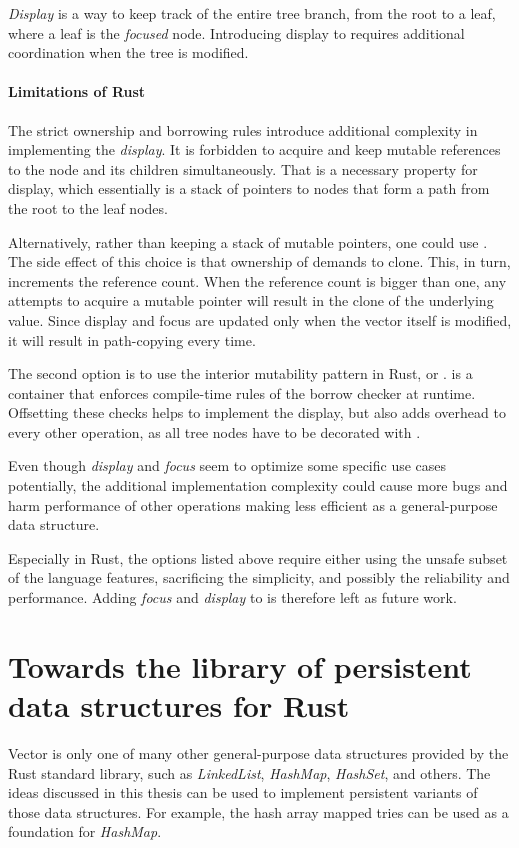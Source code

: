 \emph{Display} is a way to keep track of the entire tree branch, from the root to a leaf, where a leaf is the \emph{focused} node. Introducing display to \rrbtree{} requires additional coordination when the tree is modified.

\paragraph{Limitations of Rust}
The strict ownership and borrowing rules introduce additional complexity in implementing the \emph{display}. It is forbidden to acquire and keep mutable references to the node and its children simultaneously. That is a necessary property for display, which essentially is a stack of pointers to nodes that form a path from the root to the leaf nodes.

Alternatively, rather than keeping a stack of mutable pointers, one could use \rc{}. The side effect of this choice is that ownership of \rc{} demands to clone. This, in turn, increments the reference count. When the reference count is bigger than one, any attempts to acquire a mutable pointer will result in the clone of the underlying value. Since display and focus are updated only when the vector itself is modified, it will result in path-copying every time.

The second option is to use the interior mutability pattern in Rust, or .  is a container that enforces compile-time rules of the borrow checker at runtime. Offsetting these checks helps to implement the display, but also adds overhead to every other operation, as all tree nodes have to be decorated with .

Even though \emph{display} and \emph{focus} seem to optimize some specific use cases potentially, the additional implementation complexity could cause more bugs and harm performance of other operations making \rrbtree{} less efficient as a general-purpose data structure.

Especially in Rust, the options listed above require either using the unsafe subset of the language features, sacrificing the simplicity, and possibly the reliability and performance. Adding \emph{focus} and \emph{display} to \rrbvec{} is therefore left as future work.

\section{Towards the library of persistent data structures for Rust}
Vector is only one of many other general-purpose data structures provided by the Rust standard library, such as \emph{LinkedList}, \emph{HashMap}, \emph{HashSet}, and others. The ideas discussed in this thesis can be used to implement persistent variants of those data structures. For example, the hash array mapped tries \cite{ideal-hash-trees} can be used as a foundation for \emph{HashMap}.

